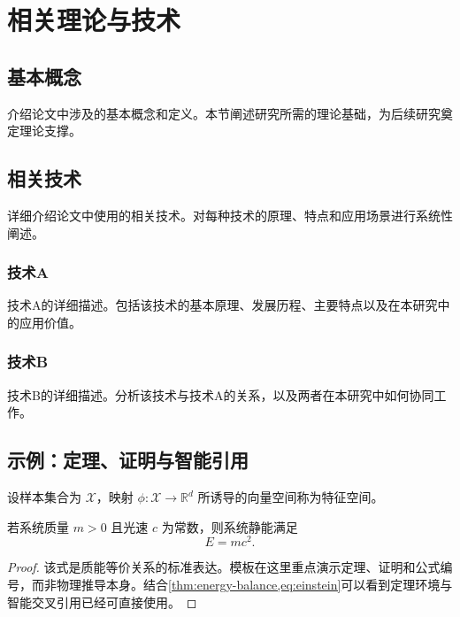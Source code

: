 \chapter{相关理论与技术}

\section{基本概念}

介绍论文中涉及的基本概念和定义。本节阐述研究所需的理论基础，为后续研究奠定理论支撑。

\section{相关技术}

详细介绍论文中使用的相关技术。对每种技术的原理、特点和应用场景进行系统性阐述。

\subsection{技术A}

技术A的详细描述。包括该技术的基本原理、发展历程、主要特点以及在本研究中的应用价值。

\subsection{技术B}

技术B的详细描述。分析该技术与技术A的关系，以及两者在本研究中如何协同工作。

\section{示例：定理、证明与智能引用}

\begin{definition}\label{def:feature-space}
设样本集合为 $\mathcal{X}$，映射 $\phi: \mathcal{X}\rightarrow\mathbb{R}^{d}$ 所诱导的向量空间称为特征空间。
\end{definition}

\begin{theorem}\label{thm:energy-balance}
若系统质量 $m>0$ 且光速 $c$ 为常数，则系统静能满足
\begin{equation}
    E = mc^2.
    \label{eq:einstein}
\end{equation}
\end{theorem}

\begin{proof}
该式是质能等价关系的标准表达。模板在这里重点演示定理、证明和公式编号，而非物理推导本身。结合\cref{thm:energy-balance,eq:einstein}可以看到定理环境与智能交叉引用已经可直接使用。
\end{proof}

